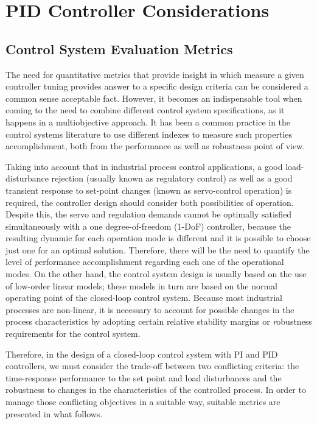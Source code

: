 \chapter{PID Controller Considerations}
\label{chap:PIDControllerDesign}

\section{Control System Evaluation Metrics}

The need for quantitative metrics that provide insight in which measure a given controller tuning provides answer to a specific design criteria can be considered a common sense acceptable fact. However, it becomes an indispensable tool when coming to the need to combine different control system specifications, as it happens in a multiobjective approach.  It has been a common practice in the control systems literature to use different indexes to measure such properties accomplishment, both from the performance as well as robustness point of view.

Taking into account that in industrial process control applications, a good load-disturbance rejection (usually known as regulatory control) as well as a good transient response to set-point changes (known as servo-control operation) is required, the controller design should consider both possibilities of operation. Despite this, the servo and regulation demands cannot be optimally satisfied simultaneously with a one degree-of-freedom (1-DoF) controller, because the resulting dynamic for each operation mode is different and it is possible to choose just one for an optimal solution. Therefore, there will be the need to quantify the level of {\emph performance} accomplishment regarding each one of the operational modes. On the other hand, the control system design is usually based on the use of low-order linear models; these models in turn are based on the normal operating point of the closed-loop control system. Because most industrial processes are non-linear, it is necessary to account for possible changes in the process characteristics by adopting certain relative stability margins or {\emph robustness} requirements for the control system.

Therefore, in the design of a closed-loop control system with PI and PID controllers, we must consider the trade-off between two conflicting criteria: the time-response performance to the set point and load disturbances and the robustness to changes in the characteristics of the controlled process. In order to manage those conflicting objectives in a suitable way, suitable metrics are presented in what follows.
 
